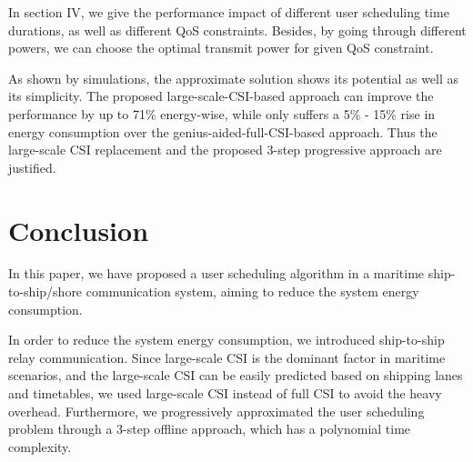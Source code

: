 \documentclass[conference]{IEEEtran}
\begin{document}
 

 In section IV, we give the performance impact of different user scheduling time durations, as well as different QoS constraints. 
 Besides, by going through different powers, we can choose the optimal transmit power for given QoS constraint. 

 As shown by simulations, the approximate solution shows its potential as well as its simplicity. The proposed large-scale-CSI-based approach can improve the performance by up to 71\% energy-wise, while only suffers a 5\% - 15\% rise in energy consumption over the genius-aided-full-CSI-based approach. Thus the large-scale CSI replacement and the proposed 3-step progressive approach are justified. 

 
 \section{Conclusion}\label{sec:5}
 
 In this paper, we have proposed a user scheduling algorithm in a maritime ship-to-ship/shore communication system, aiming to reduce the system energy consumption. 
 
 In order to reduce the system energy consumption, we introduced ship-to-ship relay communication. 
 Since large-scale CSI is the dominant factor in maritime scenarios, and the large-scale CSI can be easily predicted based on shipping lanes and timetables, we used large-scale CSI instead of full CSI to avoid the heavy overhead. Furthermore, we progressively approximated the user scheduling problem through a 3-step offline approach, which has a polynomial time complexity. 
 
\end{document}
